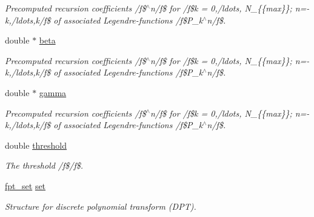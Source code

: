 \begin{CompactItemize}
\begin{CompactList}\small\item\em Precomputed recursion coefficients /f\$$^\wedge$n/f\$ for /f\$k = 0,/ldots, N\_\-\{\{max\}\}; n=-k,/ldots,k/f\$ of associated Legendre-functions /f\$P\_\-k$^\wedge$n/f\$. \item\end{CompactList}\item 
\hypertarget{structnfsft__wisdom_6bcfe5201d3fed513c2cdb37832ee255}{
double $\ast$ \hyperlink{structnfsft__wisdom_6bcfe5201d3fed513c2cdb37832ee255}{beta}}
\label{structnfsft__wisdom_6bcfe5201d3fed513c2cdb37832ee255}

\begin{CompactList}\small\item\em Precomputed recursion coefficients /f\$$^\wedge$n/f\$ for /f\$k = 0,/ldots, N\_\-\{\{max\}\}; n=-k,/ldots,k/f\$ of associated Legendre-functions /f\$P\_\-k$^\wedge$n/f\$. \item\end{CompactList}\item 
\hypertarget{structnfsft__wisdom_1703c0339b14ee1f0956d3e394f598e2}{
double $\ast$ \hyperlink{structnfsft__wisdom_1703c0339b14ee1f0956d3e394f598e2}{gamma}}
\label{structnfsft__wisdom_1703c0339b14ee1f0956d3e394f598e2}

\begin{CompactList}\small\item\em Precomputed recursion coefficients /f\$$^\wedge$n/f\$ for /f\$k = 0,/ldots, N\_\-\{\{max\}\}; n=-k,/ldots,k/f\$ of associated Legendre-functions /f\$P\_\-k$^\wedge$n/f\$. \item\end{CompactList}\item 
\hypertarget{structnfsft__wisdom_c367edaa1fae041e5b049cd81b44336b}{
double \hyperlink{structnfsft__wisdom_c367edaa1fae041e5b049cd81b44336b}{threshold}}
\label{structnfsft__wisdom_c367edaa1fae041e5b049cd81b44336b}

\begin{CompactList}\small\item\em The threshold /f\$/f\$. \item\end{CompactList}\item 
\hypertarget{structnfsft__wisdom_18de3dcf9ca2e2e577fccfcca712bfd2}{
\hyperlink{group__fpt_g73d630ac21d6474ba0693f124d465e15}{fpt\_\-set} \hyperlink{structnfsft__wisdom_18de3dcf9ca2e2e577fccfcca712bfd2}{set}}
\label{structnfsft__wisdom_18de3dcf9ca2e2e577fccfcca712bfd2}

\begin{CompactList}\small\item\em Structure for {\em discrete\/} {\em polynomial\/} {\em transform\/} ({\em DPT\/}). \item\end{CompactList}\end{CompactItemize}


